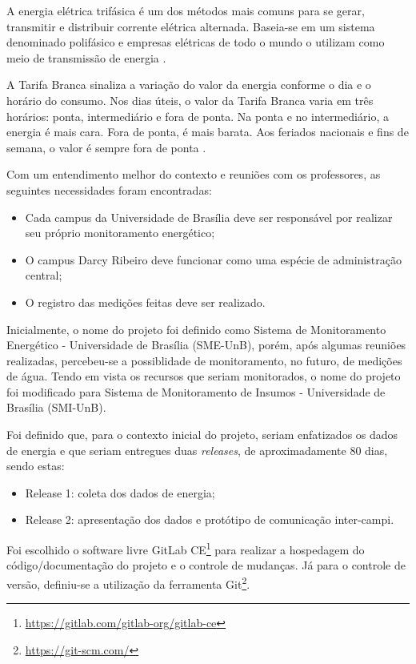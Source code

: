 A energia elétrica trifásica é um dos métodos mais comuns para se gerar, transmitir e distribuir corrente elétrica alternada. Baseia-se em um sistema denominado polifásico e empresas elétricas de todo o mundo o utilizam como meio de transmissão de energia \cite{stevenson_1962}.

A Tarifa Branca sinaliza a variação do valor da energia conforme o dia e o horário do consumo. Nos dias úteis, o valor da Tarifa Branca varia em três horários: ponta, intermediário e fora de ponta. Na ponta e no intermediário, a energia é mais cara. Fora de ponta, é mais barata. Aos feriados nacionais e fins de semana, o valor é sempre fora de ponta \cite{aneel}.

Com um entendimento melhor do contexto e reuniões com os professores, as seguintes necessidades foram encontradas:

\begin{itemize}
    \item Cada campus da Universidade de Brasília deve ser responsável por realizar seu próprio monitoramento energético;
    \item O campus Darcy Ribeiro deve funcionar como uma espécie de administração central;
    \item O registro das medições feitas deve ser realizado.
\end{itemize}

Inicialmente, o nome do projeto foi definido como Sistema de Monitoramento Energético - Universidade de Brasília (SME-UnB), porém, após algumas reuniões realizadas, percebeu-se a possiblidade de monitoramento, no futuro, de medições de água. Tendo em vista os recursos que seriam monitorados, o nome do projeto foi modificado para Sistema de Monitoramento de Insumos - Universidade de Brasília (SMI-UnB).

Foi definido que, para o contexto inicial do projeto, seriam enfatizados os dados de energia e que seriam entregues duas \textit{releases}, de aproximadamente 80 dias, sendo estas:

\begin{itemize}
    \item Release 1: coleta dos dados de energia;
    \item Release 2: apresentação dos dados e protótipo de comunicação inter-campi.
\end{itemize}

Foi escolhido o software livre GitLab CE\footnote{\url{https://gitlab.com/gitlab-org/gitlab-ce}} para realizar a hospedagem do código/documentação do projeto e o controle de mudanças. Já para o controle de versão, definiu-se a utilização da ferramenta Git\footnote{\url{https://git-scm.com/}}.

